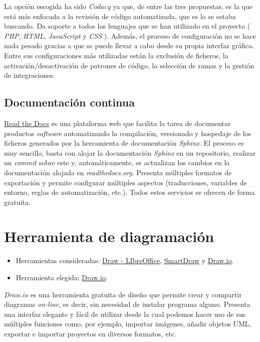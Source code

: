 La opción escogida ha sido \emph{Codacy} ya que, de entre las tres
propuestas, es la que está más enfocada a la revisión de código
automatizada, que es lo se estaba buscando. Da soporte a todos los
lenguajes que se han utilizado en el proyecto ( \emph{PHP}, \emph{HTML},
\emph{JavaScript} y \emph{CSS} ). Además, el proceso de configuración no
se hace nada pesado gracias a que se puede llevar a cabo desde su propia
interfaz gráfica. Entre sus configuraciones más utilizadas están la
exclusión de ficheros, la activación/desactivación de patrones de
código, la selección de ramas y la gestión de integraciones.

\subsection{Documentación continua}

\href{https://readthedocs.org/}{Read the Docs} es una plataforma web que
facilita la tarea de documentar productos \emph{software} automatizando
la compilación, versionado y hospedaje de los ficheros generados por la
herramienta de documentación \emph{Sphinx}. El proceso es muy sencillo,
basta con alojar la documentación \emph{Sphinx} en un repositorio,
realizar un \emph{commit} sobre este y, automáticamente, se actualizan
los cambios en la documentación alojada en \emph{readthedocs.org}.
Presenta múltiples formatos de exportación y permite configurar
múltiples aspectos (traducciones, variables de entorno, reglas de
automatización, etc.). Todos estos servicios se ofrecen de forma
gratuita.

\section{Herramienta de diagramación}

\begin{itemize}
\tightlist
\item
  Herramientas consideradas:
  \href{https://es.libreoffice.org/descubre/draw/}{Draw - LIbreOffice},
  \href{https://www.smartdraw.com/}{SmartDraw} y
  \href{https://app.diagrams.net/}{Draw.io}.
\item
  Herramienta elegida: \href{https://app.diagrams.net/}{Draw.io}.
\end{itemize}

\emph{Draw.io} es una herramienta gratuita de diseño que permite crear y
compartir diagramas \emph{on-line}, es decir, sin necesidad de instalar
programa alguno. Presenta una interfaz elegante y fácil de utilizar
desde la cual podemos hacer uso de sus múltiples funciones como, por
ejemplo, importar imágenes, añadir objetos UML, exportar e importar
proyectos en diversos formatos, etc.

